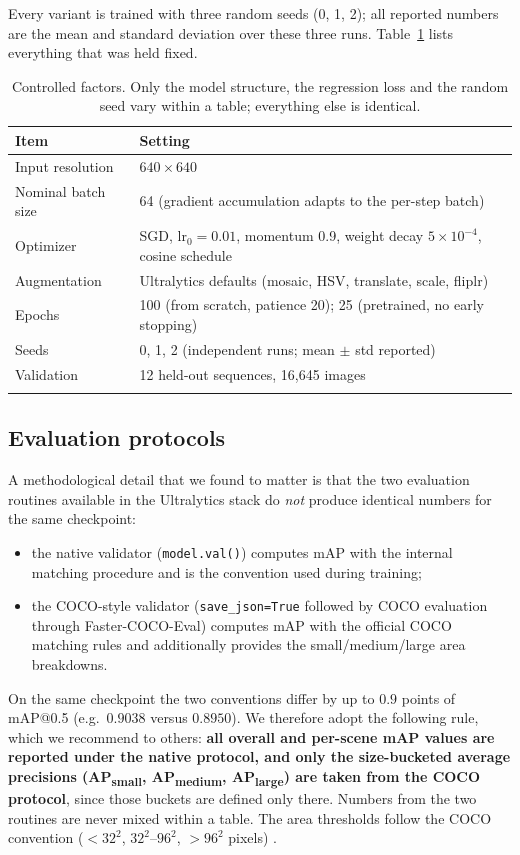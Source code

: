 \documentclass[pdflatex,sn-basic,Numbered]{sn-jnl}%
\begin{document}
Every variant is trained with three random seeds (0, 1, 2); all reported numbers are the mean and standard deviation over these three runs. Table~\ref{tab:identical} lists everything that was held fixed.

\begin{table}[h]
\caption{Controlled factors. Only the model structure, the regression loss and the random seed vary within a table; everything else is identical.}\label{tab:identical}%
\centering
\begin{tabular}{@{}p{}p{}@{}}
\toprule
Item & Setting\\
\midrule
Input resolution & $640\times640$\\
Nominal batch size & 64 (gradient accumulation adapts to the per-step batch)\\
Optimizer & SGD, lr$_0=0.01$, momentum 0.9, weight decay $5\times10^{-4}$, cosine schedule\\
Augmentation & Ultralytics defaults (mosaic, HSV, translate, scale, fliplr)\\
Epochs & 100 (from scratch, patience 20); 25 (pretrained, no early stopping)\\
Seeds & 0, 1, 2 (independent runs; mean $\pm$ std reported)\\
Validation & 12 held-out sequences, 16{,}645 images\\
\botrule
\end{tabular}
\end{table}

\subsection{Evaluation protocols}\label{sec:protocols}

A methodological detail that we found to matter is that the two evaluation routines available in the Ultralytics stack do \emph{not} produce identical numbers for the same checkpoint:
\begin{itemize}
\item the native validator (\texttt{model.val()}) computes mAP with the internal matching procedure and is the convention used during training;
\item the COCO-style validator (\texttt{save\_json=True} followed by COCO evaluation through Faster-COCO-Eval) computes mAP with the official COCO matching rules and additionally provides the small/medium/large area breakdowns.
\end{itemize}
On the same checkpoint the two conventions differ by up to $0.9$ points of mAP@0.5 (e.g.\ $0.9038$ versus $0.8950$). We therefore adopt the following rule, which we recommend to others: \textbf{all overall and per-scene mAP values are reported under the native protocol, and only the size-bucketed average precisions (AP\textsubscript{small}, AP\textsubscript{medium}, AP\textsubscript{large}) are taken from the COCO protocol}, since those buckets are defined only there. Numbers from the two routines are never mixed within a table. The area thresholds follow the COCO convention ($<32^2$, $32^2$--$96^2$, $>96^2$ pixels) \cite{lin2014coco}.
\end{document}
